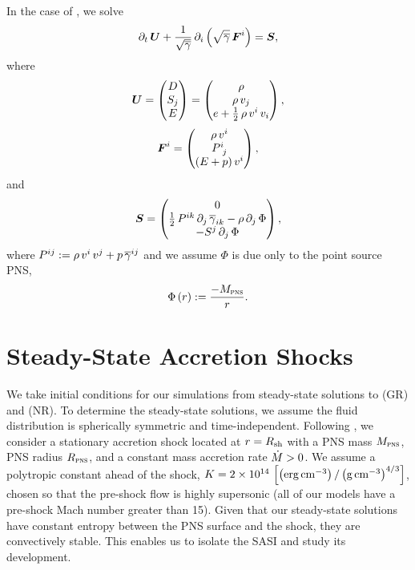 In the case of , we solve\begin{equation}
  \partial_{t}\,\boldsymbol{U}
  +\frac{1}{\sqrt{\overline{\gamma}}}\,
  \partial_{i}\left(\sqrt{\overline{\gamma}}\,\boldsymbol{F}^{i}\right)=\boldsymbol{S},
  \label{eq.cLawsNR}
\end{equation}
where
\begin{equation}
  \boldsymbol{U}
  =\begin{pmatrix}
  D\\
  S_{j}\\
  E
  \end{pmatrix}
  =\begin{pmatrix}
  \rho\\
  \rho\,v_{j}\\
  e+\frac{1}{2}\,\rho\,v^{i}\,v_{i}
  \end{pmatrix},
\end{equation}
\begin{equation}
  \boldsymbol{F}^{i}
  =\begin{pmatrix}
  \rho\,v^{i}\\
  P^{i}_{~j}\\
  \left(E+p\right)v^{i}
  \end{pmatrix},
\end{equation}
and
\begin{equation}
  \boldsymbol{S}
  =\begin{pmatrix}
  0\\
  \frac{1}{2}\,P^{ik}\,\partial_{j}\,\overline{\gamma}_{ik}
  -\rho\,\partial_{j}\,\Phi\\
  -S^{j}\,\partial_{j}\,\Phi
  \end{pmatrix},
\end{equation}
where
$P^{ij}:=\rho\,v^{i}\,v^{j}+p\,\overline{\gamma}^{ij}$ and we assume $\Phi$
is due only to the point source PNS,
\begin{equation}
  \Phi\left(r\right):=\frac{-M_{\textsc{pns}}}{r}.
\end{equation}

\section{Steady-State Accretion Shocks}
\label{ss.ssas}

We take initial conditions for our simulations from steady-state
solutions to  (GR) and  (NR).
To determine the steady-state solutions,
we assume the fluid distribution is spherically symmetric and time-independent.
Following \citet{bmd2003},
we consider a stationary accretion shock located at $r=R_{\mathrm{sh}}$
with a PNS mass $M_{\textsc{pns}}$, PNS radius $R_{\textsc{pns}}$,
and a constant mass accretion rate
$\dot{M}>0$.
We assume a polytropic constant ahead of the shock, $K=2\times10^{14}\,
\left[\left(\mathrm{erg}\,\mathrm{cm}^{-3}\right)/\left(\mathrm{g}\,\mathrm{cm}^{-3}\right)^{4/3}\right]$,
chosen so that the pre-shock flow is highly supersonic
(all of our models have a pre-shock Mach number greater than 15).
Given that our steady-state solutions have constant
entropy between the PNS surface and the shock, they are convectively stable.
This enables us to isolate the SASI and study its development.

